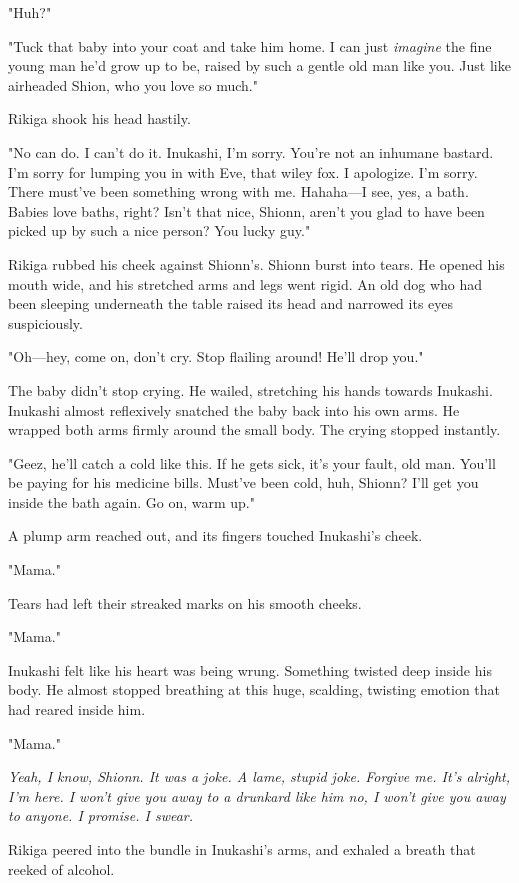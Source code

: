"Huh?"

"Tuck that baby into your coat and take him home. I can just \emph{imagine} the
fine young man he'd grow up to be, raised by such a gentle old man like
you. Just like airheaded Shion, who you love so much."

Rikiga shook his head hastily.

"No can do. I can't do it. Inukashi, I'm sorry. You're not an inhumane
bastard. I'm sorry for lumping you in with Eve, that wiley fox. I
apologize. I'm sorry. There must've been something wrong with me.
Hahaha---I see, yes, a bath. Babies love baths, right? Isn't that nice,
Shionn, aren't you glad to have been picked up by such a nice person?
You lucky guy."

Rikiga rubbed his cheek against Shionn's. Shionn burst into tears. He
opened his mouth wide, and his stretched arms and legs went rigid. An
old dog who had been sleeping underneath the table raised its head and
narrowed its eyes suspiciously.

"Oh---hey, come on, don't cry. Stop flailing around! He'll drop you."

The baby didn't stop crying. He wailed, stretching his hands towards
Inukashi. Inukashi almost reflexively snatched the baby back into his
own arms. He wrapped both arms firmly around the small body. The crying
stopped instantly.

"Geez, he'll catch a cold like this. If he gets sick, it's your fault,
old man. You'll be paying for his medicine bills. Must've been cold,
huh, Shionn? I'll get you inside the bath again. Go on, warm up."

A plump arm reached out, and its fingers touched Inukashi's cheek.

"Mama."

Tears had left their streaked marks on his smooth cheeks.

"Mama."

Inukashi felt like his heart was being wrung. Something twisted deep
inside his body. He almost stopped breathing at this huge, scalding,
twisting emotion that had reared inside him.

"Mama."

\emph{Yeah, I know, Shionn. It was a joke. A lame, stupid joke. Forgive me.
It's alright, I'm here. I won't give you away to a drunkard like him\el 
no, I won't give you away to anyone. I promise. I swear.}

\mybreak

Rikiga peered into the bundle in Inukashi's arms, and exhaled a breath
that reeked of alcohol.

